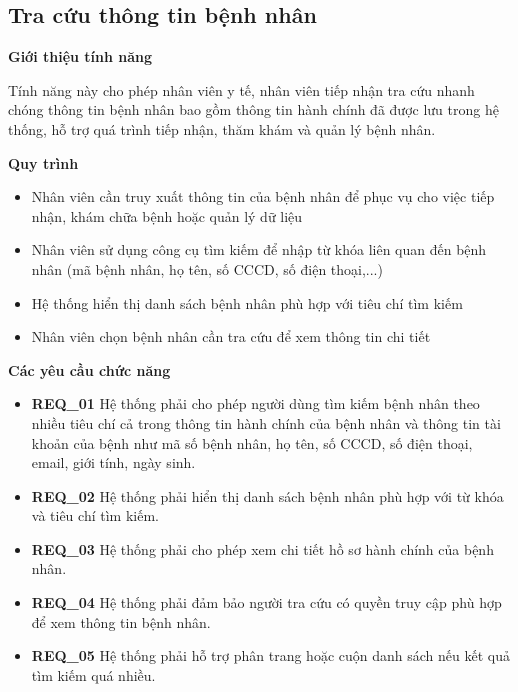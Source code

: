 \subsection{Tra cứu thông tin bệnh nhân}

\noindent \textbf{Giới thiệu tính năng}

Tính năng này cho phép nhân viên y tế, nhân viên tiếp nhận tra cứu nhanh chóng thông tin bệnh nhân bao gồm thông tin hành chính đã được lưu trong hệ thống, hỗ trợ quá trình tiếp nhận, thăm khám và quản lý bệnh nhân.

\noindent \textbf{Quy trình}

\begin{itemize}

  \item Nhân viên cần truy xuất thông tin của bệnh nhân để phục vụ cho việc tiếp nhận, khám chữa bệnh hoặc quản lý dữ liệu

  \item Nhân viên sử dụng công cụ tìm kiếm để nhập từ khóa liên quan đến bệnh nhân (mã bệnh nhân, họ tên, số CCCD, số điện thoại,...)

  \item Hệ thống hiển thị danh sách bệnh nhân phù hợp với tiêu chí tìm kiếm

  \item Nhân viên chọn bệnh nhân cần tra cứu để xem thông tin chi tiết

\end{itemize}

\noindent \textbf{Các yêu cầu chức năng}

\begin{itemize}

  \item \textbf{REQ\_01} Hệ thống phải cho phép người dùng tìm kiếm bệnh nhân theo nhiều tiêu chí cả trong thông tin hành chính của bệnh nhân và thông tin tài khoản của bệnh như mã số bệnh nhân, họ tên, số CCCD, số điện thoại, email, giới tính, ngày sinh.

  \item \textbf{REQ\_02} Hệ thống phải hiển thị danh sách bệnh nhân phù hợp với từ khóa và tiêu chí tìm kiếm.

  \item \textbf{REQ\_03} Hệ thống phải cho phép xem chi tiết hồ sơ hành chính của bệnh nhân.

  \item \textbf{REQ\_04} Hệ thống phải đảm bảo người tra cứu có quyền truy cập phù hợp để xem thông tin bệnh nhân.

  \item \textbf{REQ\_05} Hệ thống phải hỗ trợ phân trang hoặc cuộn danh sách nếu kết quả tìm kiếm quá nhiều.

\end{itemize}

